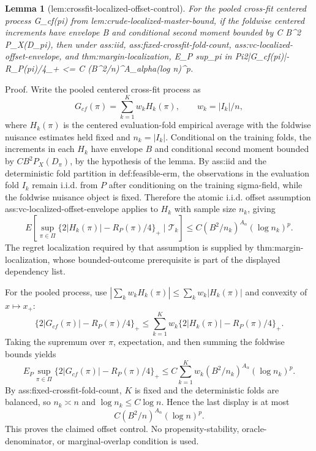 \documentclass{article}
\newtheorem{lemma}{Lemma}
\begin{document}
\begin{lemma}[lem:crossfit-localized-offset-control]\label{lem:crossfit-localized-offset-control}
For the pooled cross-fit centered process G_cf(pi) from lem:crude-localized-master-bound, if the foldwise centered increments have envelope B and conditional second moment bounded by C B^2 P_X(D_pi), then under ass:iid, ass:fixed-crossfit-fold-count, ass:vc-localized-offset-envelope, and thm:margin-localization, E_P sup_{pi in Pi}{2|G_cf(pi)|-R_P(pi)/4}_+ <= C (B^2/n)^{A_alpha}(log n)^p.
\end{lemma}
Proof. Write the pooled centered cross-fit process as
\[
G_{cf}(\pi)=\sum_{k=1}^K w_k H_k(\pi),\qquad w_k=|I_k|/n,
\]
where \(H_k(\pi)\) is the centered evaluation-fold empirical average with the foldwise nuisance estimates held fixed and \(n_k=|I_k|\). Conditional on the training folds, the increments in each \(H_k\) have envelope \(B\) and conditional second moment bounded by \(C B^2P_X(D_\pi)\), by the hypothesis of the lemma. By ass:iid and the deterministic fold partition in def:feasible-erm, the observations in the evaluation fold \(I_k\) remain i.i.d. from \(P\) after conditioning on the training sigma-field, while the foldwise nuisance object is fixed. Therefore the atomic i.i.d. offset assumption ass:vc-localized-offset-envelope applies to \(H_k\) with sample size \(n_k\), giving
\[
E\left[\sup_{\pi\in\Pi}\{2|H_k(\pi)|-R_P(\pi)/4\}_+\mid \mathcal T_k\right]
\le C(B^2/n_k)^{A_\alpha}(\log n_k)^p.
\]
The regret localization required by that assumption is supplied by thm:margin-localization, whose bounded-outcome prerequisite is part of the displayed dependency list.

For the pooled process, use \(|\sum_k w_kH_k(\pi)|\le\sum_kw_k|H_k(\pi)|\) and convexity of \(x\mapsto x_+\):
\[
\{2|G_{cf}(\pi)|-R_P(\pi)/4\}_+
\le \sum_{k=1}^K w_k\{2|H_k(\pi)|-R_P(\pi)/4\}_+.
\]
Taking the supremum over \(\pi\), expectation, and then summing the foldwise bounds yields
\[
E_P\sup_{\pi\in\Pi}\{2|G_{cf}(\pi)|-R_P(\pi)/4\}_+
\le C\sum_{k=1}^K w_k(B^2/n_k)^{A_\alpha}(\log n_k)^p.
\]
By ass:fixed-crossfit-fold-count, \(K\) is fixed and the deterministic folds are balanced, so \(n_k\asymp n\) and \(\log n_k\le C\log n\). Hence the last display is at most
\[
C(B^2/n)^{A_\alpha}(\log n)^p.
\]
This proves the claimed offset control. No propensity-stability, oracle-denominator, or marginal-overlap condition is used.
\end{document}
